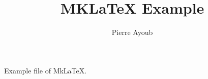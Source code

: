 \documentclass[paper=a4,fontsize=11pt]{article}
\begin{document}
\title{MKLaTeX Example}
\author{Pierre Ayoub}

\maketitle

Example file of MkLaTeX.




\printbibliography{}
\end{document}
